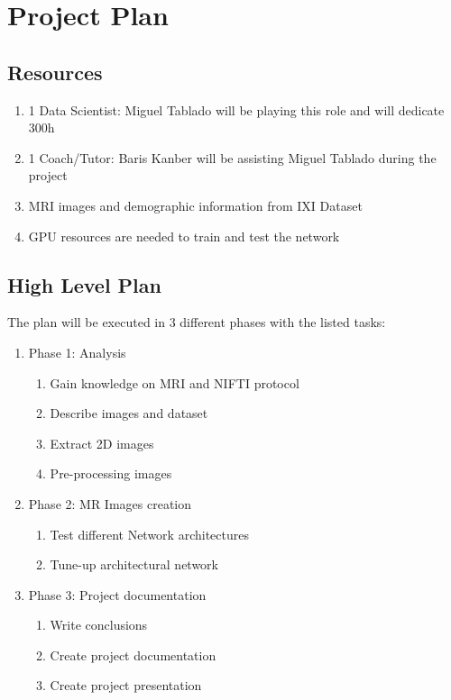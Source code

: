 \section{Project Plan}

\subsection{Resources}

\begin{enumerate}
    \item 1 Data Scientist: Miguel Tablado will be playing this role and will dedicate 300h
    \item 1 Coach/Tutor: Baris Kanber will be assisting Miguel Tablado during the project
    \item MRI images and demographic information from IXI Dataset
    \item GPU resources are needed to train and test the network
\end{enumerate}

\subsection{High Level Plan}

The plan will be executed in 3 different phases with the listed tasks:
\begin{enumerate}
    \item Phase 1: Analysis
    \begin{enumerate}
        \item Gain knowledge on MRI and NIFTI protocol
        \item Describe images and dataset
        \item Extract 2D images
        \item Pre-processing images
    \end{enumerate}
    \item Phase 2: MR Images creation
    \begin{enumerate}
        \item Test different Network architectures
        \item Tune-up architectural network
    \end{enumerate}
    \item Phase 3: Project documentation
    \begin{enumerate}
        \item Write conclusions
        \item Create project documentation
        \item Create project presentation
    \end{enumerate}
\end{enumerate}

